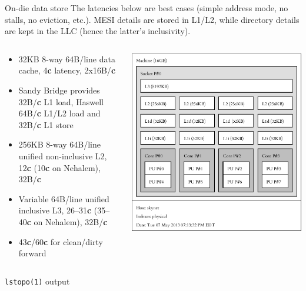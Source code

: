 \documentclass[mathserif,xcolor={dvipsnames,table}]{beamer}
\begin{document}
\begin{frame}{On-die data store}
The latencies below are best cases (simple address mode, no stalls, no eviction, etc.). MESI details are stored
in L1/L2, while directory details are kept in the LLC (hence the latter's
inclusivity).
\vfill
\begin{columns}
\begin{column}{0.5\textwidth}
\small{
\begin{itemize}
\item 32KB 8-way 64B/line data cache, 4\textbf{c} latency, 2x16B/\textbf{c}
\item Sandy Bridge provides 32B/\textbf{c} L1 load, Haswell 64B/\textbf{c} L1/L2 load and 32B/\textbf{c} L1 store
\item 256KB 8-way 64B/line unified non-inclusive L2, 12\textbf{c} (10\textbf{c} on Nehalem), 32B/\textbf{c}
\item Variable 64B/line unified inclusive L3, 26--31\textbf{c} (35--40\textbf{c} on Nehalem), 32B/\textbf{c}
\item 43\textbf{c}/60\textbf{c} for clean/dirty forward
\end{itemize}
}
\end{column}
\begin{column}{0.5\textwidth}
\includegraphics[scale=.4]{images/skynet.pdf}
\end{column}
\end{columns}
\hfill
\tiny{\texttt{lstopo(1)} output}
\end{frame}
\end{document}
